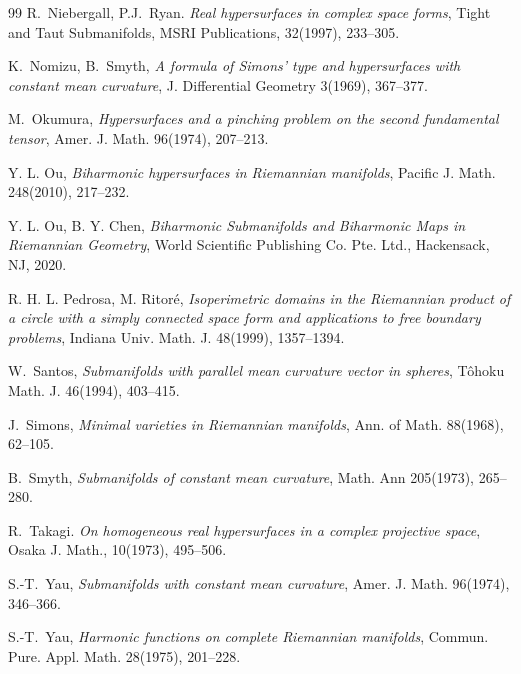 \documentclass[11pt]{amsart}
\theoremstyle{plain}
\theoremstyle{definition}
\numberwithin{equation}{section}
\begin{document}
\begin{thebibliography}{99}
 R.~Niebergall, P.J.~Ryan. \textit{Real hypersurfaces in complex space forms}, Tight and Taut
Submanifolds, MSRI Publications, 32(1997), 233--305.


 K.~Nomizu, B.~Smyth, \textit{A formula of Simons' type and hypersurfaces with constant mean
curvature}, J. Differential Geometry 3(1969), 367--377.

 M.~Okumura, \textit{Hypersurfaces and a pinching problem on the second fundamental tensor}, Amer. J. Math. 96(1974), 207--213.


 Y. L. Ou, {\it Biharmonic hypersurfaces in Riemannian manifolds}, Pacific J. Math. 248(2010), 217--232.

 Y. L. Ou, B. Y. Chen, {\it Biharmonic Submanifolds and Biharmonic Maps in Riemannian Geometry}, World Scientific Publishing Co. Pte. Ltd., Hackensack, NJ, 2020.


 R. H. L. Pedrosa, M. Ritor\'e, {\it Isoperimetric domains in the Riemannian product of a circle with a simply connected space form and applications to free boundary problems}, Indiana Univ. Math. J. 48(1999), 1357--1394.


 W.~Santos, \textit{Submanifolds with parallel mean curvature vector in spheres}, T\^ohoku Math. J. 46(1994), 403--415.


 J.~Simons, \textit{Minimal varieties in Riemannian
manifolds}, Ann. of Math. 88(1968), 62--105.



 B.~Smyth, \textit{Submanifolds of constant mean curvature}, Math. Ann 205(1973), 265--280.

 R.~Takagi. \textit{On homogeneous real hypersurfaces in a complex projective space}, Osaka J. Math., 10(1973), 495--506.

 S.-T.~Yau, \textit{Submanifolds with constant mean
curvature}, Amer. J. Math. 96(1974), 346--366.

 S.-T.~Yau, \textit{Harmonic functions on complete Riemannian manifolds}, Commun. Pure. Appl. Math. 28(1975), 201--228.
\end{thebibliography}
\end{document}
